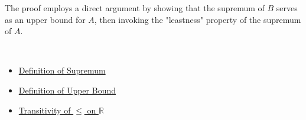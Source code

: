 \begin{remark*}
The proof employs a direct argument by showing that the supremum of $B$ serves as an upper bound for $A$, then invoking the "leastness" property of the supremum of $A$.
\end{remark*}

\begin{remark*}[Dependencies]~\\
\begin{itemize}
  \item \hyperref[def:supremum]{Definition of Supremum}
  \item \hyperref[def:upper-bound]{Definition of Upper Bound}
  \item \hyperref[ax:transitivity-of-order]{Transitivity of $\le$ on $\mathbb{R}$}
\end{itemize}
\end{remark*}